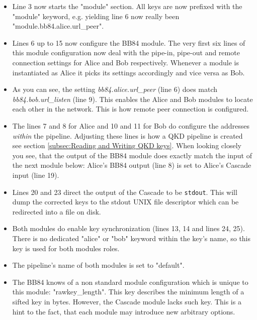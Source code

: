 \begin{itemize}

\item Line 3 now starts the "module" section. All keys are now prefixed with the "module" keyword, e.g. yielding line 6 now really been "module.bb84.alice.url\_peer".

\item Lines 6 up to 15 now configure the BB84 module. The very first six lines of this module configuration now deal with the pipe-in, pipe-out and remote connection settings for Alice and Bob respectively. Whenever a module is instantiated as Alice it picks its settings accordingly and vice versa as Bob. 

\item As you can see, the setting \emph{bb84.alice.url\_peer} (line 6) does match \emph{bb84.bob.url\_listen} (line 9). This enables the Alice and Bob modules to locate each other in the network. This is how remote peer connection is configured.

\item The lines 7 and 8 for Alice and 10 and 11 for Bob do configure the addresses \emph{within} the pipeline. Adjusting these lines is how a QKD pipeline is created see section \ref{subsec:Reading and Writing QKD keys}. When looking closely you see, that the output of the BB84 module does exactly match the input of the next module below: Alice's BB84 output (line 8) is set to Alice's Cascade input (line 19).

\item Lines 20 and 23 direct the output of the Cascade to be \texttt{stdout}. This will dump the corrected keys to the stdout UNIX file descriptor which can be redirected into a file on disk.

\item Both modules do enable key synchronization (lines 13, 14 and lines 24, 25). There is no dedicated "alice" or "bob" keyword within the key's name, so this key is used for both modules roles. 

\item The pipeline's name of both modules is set to "default".

\item The BB84 knows of a non standard module configuration which is unique to this module: "rawkey\_length". This key describes the minimum length of a sifted key in bytes. However, the Cascade module lacks such key. This is a hint to the fact, that each module may introduce new arbitrary options.

\end{itemize}

